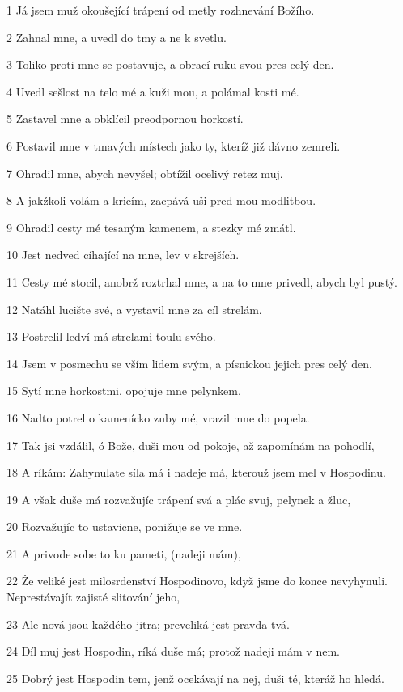 \par 1 Já jsem muž okoušející trápení od metly rozhnevání Božího.
\par 2 Zahnal mne, a uvedl do tmy a ne k svetlu.
\par 3 Toliko proti mne se postavuje, a obrací ruku svou pres celý den.
\par 4 Uvedl sešlost na telo mé a kuži mou, a polámal kosti mé.
\par 5 Zastavel mne a obklícil preodpornou horkostí.
\par 6 Postavil mne v tmavých místech jako ty, kteríž již dávno zemreli.
\par 7 Ohradil mne, abych nevyšel; obtížil ocelivý retez muj.
\par 8 A jakžkoli volám a kricím, zacpává uši pred mou modlitbou.
\par 9 Ohradil cesty mé tesaným kamenem, a stezky mé zmátl.
\par 10 Jest nedved cíhající na mne, lev v skrejších.
\par 11 Cesty mé stocil, anobrž roztrhal mne, a na to mne privedl, abych byl pustý.
\par 12 Natáhl lucište své, a vystavil mne za cíl strelám.
\par 13 Postrelil ledví má strelami toulu svého.
\par 14 Jsem v posmechu se vším lidem svým, a písnickou jejich pres celý den.
\par 15 Sytí mne horkostmi, opojuje mne pelynkem.
\par 16 Nadto potrel o kamenícko zuby mé, vrazil mne do popela.
\par 17 Tak jsi vzdálil, ó Bože, duši mou od pokoje, až zapomínám na pohodlí,
\par 18 A ríkám: Zahynulate síla má i nadeje má, kterouž jsem mel v Hospodinu.
\par 19 A však duše má rozvažujíc trápení svá a plác svuj, pelynek a žluc,
\par 20 Rozvažujíc to ustavicne, ponižuje se ve mne.
\par 21 A privode sobe to ku pameti, (nadeji mám),
\par 22 Že veliké jest milosrdenství Hospodinovo, když jsme do konce nevyhynuli. Neprestávajít zajisté slitování jeho,
\par 23 Ale nová jsou každého jitra; preveliká jest pravda tvá.
\par 24 Díl muj jest Hospodin, ríká duše má; protož nadeji mám v nem.
\par 25 Dobrý jest Hospodin tem, jenž ocekávají na nej, duši té, kteráž ho hledá.
